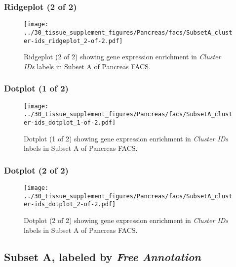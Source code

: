 \clearpage

\subsubsection{Ridgeplot (2 of 2)}
\begin{figure}[h]
\centering
\texttt{[image: ../30\_tissue\_supplement\_figures/Pancreas/facs/SubsetA\_cluster-ids\_ridgeplot\_2-of-2.pdf]}

\caption{ Ridgeplot (2 of 2)  showing gene expression enrichment in \emph{Cluster IDs} labels in Subset A of Pancreas FACS. }
\end{figure}


\clearpage

\subsubsection{Dotplot (1 of 2)}
\begin{figure}[h]
\centering
\texttt{[image: ../30\_tissue\_supplement\_figures/Pancreas/facs/SubsetA\_cluster-ids\_dotplot\_1-of-2.pdf]}

\caption{ Dotplot (1 of 2)  showing gene expression enrichment in \emph{Cluster IDs} labels in Subset A of Pancreas FACS. }
\end{figure}


\clearpage

\subsubsection{Dotplot (2 of 2)}
\begin{figure}[h]
\centering
\texttt{[image: ../30\_tissue\_supplement\_figures/Pancreas/facs/SubsetA\_cluster-ids\_dotplot\_2-of-2.pdf]}

\caption{ Dotplot (2 of 2)  showing gene expression enrichment in \emph{Cluster IDs} labels in Subset A of Pancreas FACS. }
\end{figure}


\clearpage

\subsection{Subset A, labeled by \emph{Free Annotation}}
